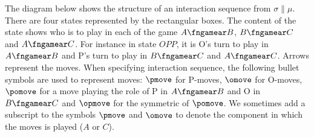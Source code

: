 The diagram below shows the structure of an interaction sequence
from $\sigma \parallel \mu$. There are four states represented by the rectangular boxes. The content of the state shows who is to play in each of the game $A\fngamear B$, $B\fngamear C$ and $A\fngamear C$.
For instance in state $OPP$, it is O's turn to play in
$A\fngamear B$ and P's turn to play in $B\fngamear C$ and $A\fngamear C$. Arrows represent the moves.
When specifying interaction sequence,
the following bullet symbols are used to represent moves:
$\pmove$ for P-moves, $\omove$ for O-moves, $\pomove$
for a move playing the role of P in $A\fngamear B$
and O in $B\fngamear C$ and $\opmove$ for
the symmetric of $\pomove$.
We sometimes add a subscript to the symbols $\pmove$ and $\omove$ to denote the component in which the moves is played ($A$ or $C$).


